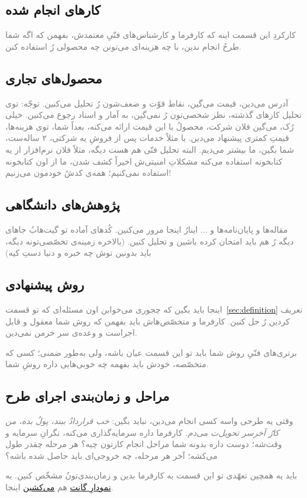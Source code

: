 \documentclass{article}
\begin{document}
\begin{framed}
	\section{کارهای انجام شده}
	\label{sec:review}
	\textcolor{gray}{کارکردِ این قسمت اینه که کارفرما و کارشناس‌های فنّیِ معتمدش، بفهمن که اگه شما طرحُ انجام ندین، با چه هزینه‌ای می‌تونن چه محصولی رُ استفاده کنن. }
	\subsection{محصول‌های تجاری}
	\textcolor{gray}{آدرس می‌دین، قیمت می‌گین، نقاط قوّت و ضعف‌شون رُ تحلیل می‌کنین. {\Large توجّه:} توی تحلیل کارهای گذشته، نظر شخصی‌تون رُ نمی‌گین، به آمار و اسناد رجوع می‌کنین. خیلی رُک، می‌گین فلان شرکت، محصولُ با این قیمت ارائه می‌کنه، بعداً شما، توی هزینه‌ها، قیمتِ کمتری پیشنهاد می‌دین. یا مثلاً خدمات پس از فروشِ یه شرکتی، ۲ ساله‌ست، شما بگین، ما بیشتر می‌دیم. البته تحلیل فنّی هم هست دیگه، مثلاً فلان نرم‌افزار از یه کتابخونه استفاده می‌کنه مشکلاتِ امنیتی‌ش اخیراً کشف شدن، ما از اون کتابخونه استفاده نمی‌کنیم؛ همه‌ی کدشُ خودمون می‌زنیم!}
	\subsection{پژوهش‌های دانشگاهی}
	\textcolor{gray}{مقاله‌ها و پایان‌نامه‌ها و ... اینارُ اینجا مرور می‌کنین. کُدهای آماده تو گیت‌هابُ جاهای دیگه رُ هم باید امتحان کرده باشین و تحلیل کنین. (بالاخره زمینه‌ی تخصّصی‌تونه دیگه، باید بدونین توش چه خبره و دنیا دستِ کیه)}
\end{framed}
\begin{framed}
	\section{روش پیشنهادی}
	\textcolor{gray}{اینجا باید بگین که چجوری می‌خواین اون مسئله‌ای که تو قسمت~\ref{sec:definition} تعریف کردین رُ حل کنین. کارفرما و متخصّص‌هاش باید بفهمن که روش شما معقول و قابل اجراست و وعده‌ی سر خرمن نمی‌دین.}

	\textcolor{gray}{برتری‌های فنّیِ روش شما باید تو این قسمت عیان باشه، ولی به‌طور ضمنی؛ کسی که متخصّصه، خودش باید بفهمه چه خوبی‌هایی داره روشِ شما.}
\end{framed}
\begin{framed}
	\section{مراحل و زمان‌بندی اجرای طرح}
	\textcolor{gray}{وقتی یه طرحی واسه کسی انجام می‌دین، نباید بگین: \emph{خب قراردادُ ببند، پولُ بده، من کارُ آخرسر تحویل‌ت می‌دم.} کارفرما داره سرمایه‌گذاری می‌کنه، نگرانِ سرمایه و وقت‌شه؛ دوست داره بدونه شما مراحل انجام کارتون چیه؟ هر مرحله چقدر طول می‌کشه؛ آخر هر مرحله، چه خروجی‌ای باید حاصل شده باشه؟}

	\textcolor{gray}{باید یه همچین تعهّدی تو این قسمت به کارفرما بدین و زمان‌بندی‌تونُ مشخّص کنین. یه \href{https://duckduckgo.com/?t=ffab\&q=what+is+a+gantt+chart\&atb=v342-1\&ia=web}{نمودارِ گانت} هم \href{https://texdoc.org/serve/pgfgantt.pdf/0}{می‌کشین} اینجا.}
\end{framed}
\end{document}
